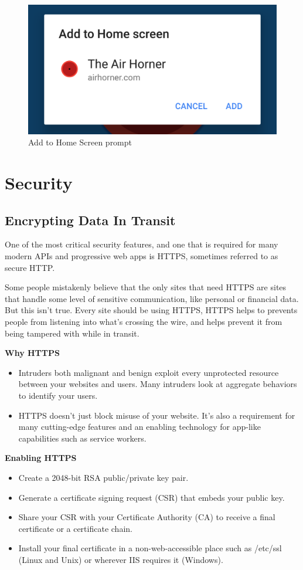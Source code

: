 \documentclass[14pt,a4paper,final]{extreport}
\begin{document}
\begin{figure}[h!]
        \centering
		\includegraphics[scale=.25]{ss4.png}
		\caption{Add to Home Screen prompt}
\end{figure}



\newpage
\chapter{Security}
\section{Encrypting Data In Transit}
\item One of the most critical security features, and one that is required for many modern APIs and progressive web apps is HTTPS, sometimes referred to as secure HTTP.

Some people mistakenly believe that the only sites that need HTTPS are sites that handle some level of sensitive communication, like personal or financial data. But this isn't true. Every site should be using HTTPS, HTTPS helps to prevents people from listening into what's crossing the wire, and helps prevent it from being tampered with while in transit. 
\item \textbf{Why HTTPS}
\begin{itemize}
    \item Intruders both malignant and benign exploit every unprotected resource between your websites and users.
    \iem Many intruders look at aggregate behaviors to identify your users.
    \item HTTPS doesn't just block misuse of your website. It's also a requirement for many cutting-edge features and an enabling technology for app-like capabilities such as service workers.
\end{itemize}
\item \textbf{Enabling HTTPS}
\begin{itemize}
    \item Create a 2048-bit RSA public/private key pair.
    \item Generate a certificate signing request (CSR) that embeds your public key.
    \item Share your CSR with your Certificate Authority (CA) to receive a final certificate or a certificate chain.
    \item Install your final certificate in a non-web-accessible place such as /etc/ssl (Linux and Unix) or wherever IIS requires it (Windows).
\end{itemize}
\end{document}
